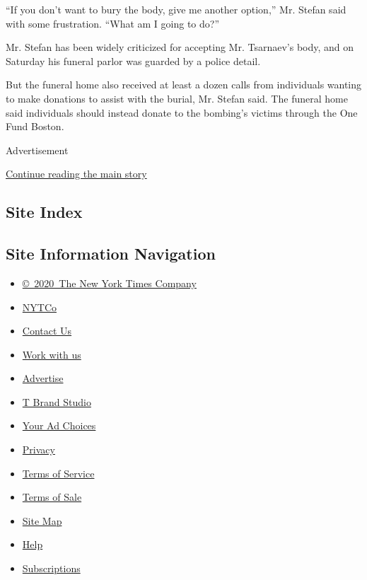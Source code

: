 ``If you don't want to bury the body, give me another option,'' Mr.
Stefan said with some frustration. ``What am I going to do?''

Mr. Stefan has been widely criticized for accepting Mr. Tsarnaev's body,
and on Saturday his funeral parlor was guarded by a police detail.

But the funeral home also received at least a dozen calls from
individuals wanting to make donations to assist with the burial, Mr.
Stefan said. The funeral home said individuals should instead donate to
the bombing's victims through the One Fund Boston.

Advertisement

\protect\hyperlink{after-bottom}{Continue reading the main story}

\hypertarget{site-index}{%
\subsection{Site Index}\label{site-index}}

\hypertarget{site-information-navigation}{%
\subsection{Site Information
Navigation}\label{site-information-navigation}}

\begin{itemize}
\tightlist
\item
  \href{https://help.nytimes.com/hc/en-us/articles/115014792127-Copyright-notice}{©~2020~The
  New York Times Company}
\end{itemize}

\begin{itemize}
\tightlist
\item
  \href{https://www.nytco.com/}{NYTCo}
\item
  \href{https://help.nytimes.com/hc/en-us/articles/115015385887-Contact-Us}{Contact
  Us}
\item
  \href{https://www.nytco.com/careers/}{Work with us}
\item
  \href{https://nytmediakit.com/}{Advertise}
\item
  \href{http://www.tbrandstudio.com/}{T Brand Studio}
\item
  \href{https://www.nytimes.com/privacy/cookie-policy\#how-do-i-manage-trackers}{Your
  Ad Choices}
\item
  \href{https://www.nytimes.com/privacy}{Privacy}
\item
  \href{https://help.nytimes.com/hc/en-us/articles/115014893428-Terms-of-service}{Terms
  of Service}
\item
  \href{https://help.nytimes.com/hc/en-us/articles/115014893968-Terms-of-sale}{Terms
  of Sale}
\item
  \href{https://spiderbites.nytimes.com}{Site Map}
\item
  \href{https://help.nytimes.com/hc/en-us}{Help}
\item
  \href{https://www.nytimes.com/subscription?campaignId=37WXW}{Subscriptions}
\end{itemize}
